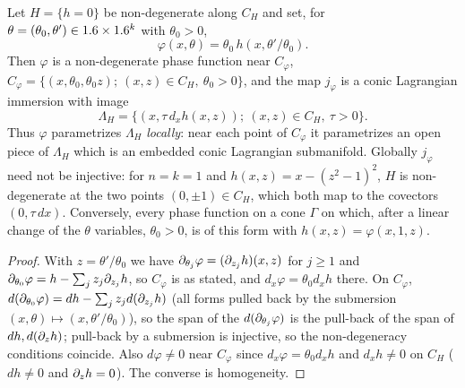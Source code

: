 \begin{proposition}\label{hj:prop:hypersurface}
  Let $H=\{h=0\}$ be non-degenerate along $C_H$ and set, for $\theta=(\theta_0,
  \theta')\in1.6\times1.6^k$ with $\theta_0>0$,
  \begin{equation*}
    \varphi(x,\theta)=\theta_0\,h(x,\theta'/\theta_0).
  \end{equation*}
  Then $\varphi$ is a non-degenerate phase function near $C_\varphi$,
  $C_\varphi=\{(x,\theta_0,\theta_0z);\ (x,z)\in C_H,\ \theta_0>0\}$, and the map
  $j_\varphi$ is a conic Lagrangian immersion with image
  \begin{equation*}
    \Lambda_H=\{(x,\tau\,d_xh(x,z));\ (x,z)\in C_H,\ \tau>0\}.
  \end{equation*}
  Thus $\varphi$ parametrizes $\Lambda_H$ \emph{locally}: near each point of
  $C_\varphi$ it parametrizes an open piece of $\Lambda_H$ which is an embedded conic
  Lagrangian submanifold.  Globally $j_\varphi$ need not be injective: for $n=k=1$ and
  $h(x,z)=x-(z^2-1)^2$, $H$ is non-degenerate at the two points $(0,\pm1)\in C_H$, which
  both map to the covectors $(0,\tau\,dx)$.
  Conversely, every phase function on a cone $\Gamma$ on which, after a linear
  change of the $\theta$ variables, $\theta_0>0$, is of this form with
  $h(x,z)=\varphi(x,1,z)$.
\end{proposition}
\begin{proof}
  With $z=\theta'/\theta_0$ we have $\partial_{\theta_j}\varphi=(\partial_{z_j}h)(x,z)$ for
  $j\ge1$ and $\partial_{\theta_0}\varphi=h-\sum_jz_j\partial_{z_j}h$, so $C_\varphi$ is as
  stated, and $d_x\varphi=\theta_0d_xh$ there.  On $C_\varphi$,
  $d(\partial_{\theta_0}\varphi)=dh-\sum_jz_jd(\partial_{z_j}h)$ (all forms pulled back by
  the submersion $(x,\theta)\mapsto(x,\theta'/\theta_0)$), so the span of the
  $d(\partial_{\theta_j}\varphi)$ is the pull-back of the span of $dh,d(\partial_zh)$;
  pull-back by a submersion is injective, so the non-degeneracy conditions
  coincide.  Also $d\varphi\ne0$ near $C_\varphi$ since $d_x\varphi=\theta_0
  d_xh$ and $d_xh\ne0$ on $C_H$ ($dh\neq0$ and $\partial_zh=0$).  The converse is
  homogeneity.
\end{proof}

